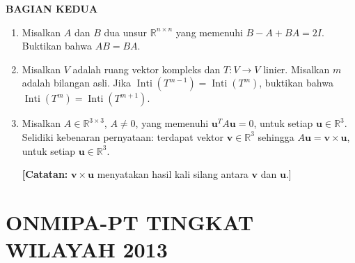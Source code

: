 \documentclass[12pt,twoside]{article}
\begin{document}
\pagebreak
\textbf{BAGIAN KEDUA}
\begin{enumerate}
	\item Misalkan $A$ dan $B$ dua unsur $\mathbb{R}^{n \times n}$ yang memenuhi $B-A+BA=2I$. Buktikan bahwa $AB=BA$.

	\item Misalkan $V$ adalah ruang vektor kompleks dan $T: V \to V$ linier. Misalkan $m$ adalah bilangan asli. Jika $\operatorname{Inti}(T^{m-1}) = \operatorname{Inti}(T^m)$, buktikan bahwa $\operatorname{Inti}(T^m) = \operatorname{Inti}(T^{m+1})$.

	\item Misalkan ${A} \in \mathbb{R}^{3 \times 3}$, ${A} \neq 0$, yang memenuhi $\mathbf{u}^T {A} \mathbf{u} = 0$, untuk setiap $\mathbf{u} \in \mathbb{R}^3$. Selidiki kebenaran pernyataan: terdapat vektor $\mathbf{v} \in \mathbb{R}^3$ sehingga ${A} \mathbf{u} = \mathbf{v} \times \mathbf{u}$, untuk setiap $\mathbf{u} \in \mathbb{R}^3$.

	      \textbf{[Catatan:} $\mathbf{v} \times \mathbf{u}$ menyatakan hasil kali silang antara $\mathbf{v}$ dan $\mathbf{u}$.]
\end{enumerate}

\pagebreak

\section{ONMIPA-PT TINGKAT WILAYAH 2013}
\end{document}
